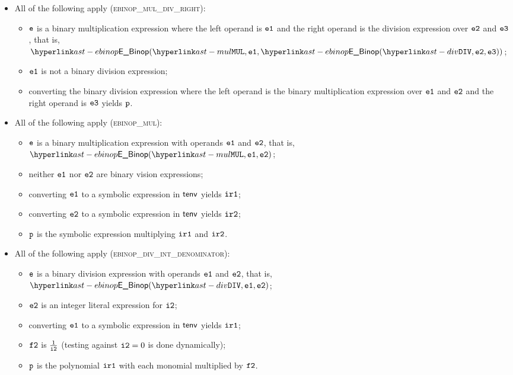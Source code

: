 \begin{itemize}
  \item All of the following apply (\textsc{ebinop\_mul\_div\_right}):
  \begin{itemize}
    \item $\texttt{e}$ is a binary multiplication expression where the left operand is $\texttt{e1}$ and the right operand
          is the division expression over $\texttt{e2}$ and $\texttt{e3}$, that is, \\
          $\EBinop(\MUL, \veone, \EBinop(\DIV, \vetwo, \vethree))$;
    \item $\texttt{e1}$ is not a binary division expression;
    \item converting the binary division expression where the left operand is the binary multiplication expression  over $\texttt{e1}$
          and $\texttt{e2}$ and the right operand is $\texttt{e3}$ yields $\texttt{p}$\ProseOrTypeErrorOrCannotBeTransformed.
  \end{itemize}

  \item All of the following apply (\textsc{ebinop\_mul}):
  \begin{itemize}
    \item $\texttt{e}$ is a binary multiplication expression with operands $\texttt{e1}$ and $\texttt{e2}$, that is, \\ $\EBinop(\MUL, \veone, \vetwo)$;
    \item neither $\texttt{e1}$ nor $\texttt{e2}$ are binary vision expressions;
    \item converting $\texttt{e1}$ to a symbolic expression in $\textsf{tenv}$ yields $\texttt{ir1}$\ProseOrTypeErrorOrCannotBeTransformed;
    \item converting $\texttt{e2}$ to a symbolic expression in $\textsf{tenv}$ yields $\texttt{ir2}$\ProseOrTypeErrorOrCannotBeTransformed;
    \item $\texttt{p}$ is the symbolic expression multiplying $\texttt{ir1}$ and $\texttt{ir2}$.
  \end{itemize}

  \item All of the following apply (\textsc{ebinop\_div\_int\_denominator}):
  \begin{itemize}
    \item $\texttt{e}$ is a binary division expression with operands $\texttt{e1}$ and $\texttt{e2}$, that is, \\ $\EBinop(\DIV, \veone, \vetwo)$;
    \item $\texttt{e2}$ is an integer literal expression for $\texttt{i2}$;
    \item converting $\texttt{e1}$ to a symbolic expression in $\textsf{tenv}$ yields $\texttt{ir1}$\ProseOrTypeErrorOrCannotBeTransformed;
    \item $\texttt{f2}$ is $\frac{1}{\texttt{i2}}$ (testing against $\texttt{i2} = 0$ is done dynamically);
    \item $\texttt{p}$ is the polynomial $\texttt{ir1}$ with each monomial multiplied by $\texttt{f2}$.
  \end{itemize}


\end{itemize}
